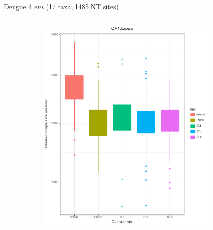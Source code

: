 \documentclass[newPxFont,numfooter,sectionpages]{beamer}
\begin{document}
\begin{frame}{Dengue 4 \textit{env} (17 taxa, 1485 NT sites)}
\begin{figure}
\begin{column}{0.5\textwidth}
    \begin{figure}
     \includegraphics[width=\textwidth]{figures/ESS_hour_CP1Kappa_dengue4.pdf} \\
     \end{figure}
\end{column}
\begin{column}{0.5\textwidth}  %
    \begin{figure}

\end{figure}
\end{column}
\end{figure}
\end{frame}
\end{document}
